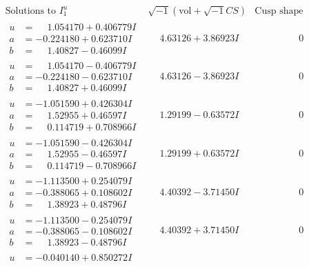 \documentclass[1p]{elsarticle_modified}
\theoremstyle{definition}
\newcommand{\I}{\sqrt{-1}}
\begin{document}
$$\begin{array}{c|c|c}
\text{Solutions to }I^u_{1}& \I (\text{vol} + \sqrt{-1}CS) & \text{Cusp shape}\\
 \hline 
\begin{aligned}
u &= \phantom{-}1.054170 + 0.406779 I \\
a &= -0.224180 + 0.623710 I \\
b &= \phantom{-}1.40827 - 0.46099 I\end{aligned}
 & \phantom{-}4.63126 + 3.86923 I & \phantom{-0.000000 } 0 \\ \hline\begin{aligned}
u &= \phantom{-}1.054170 - 0.406779 I \\
a &= -0.224180 - 0.623710 I \\
b &= \phantom{-}1.40827 + 0.46099 I\end{aligned}
 & \phantom{-}4.63126 - 3.86923 I & \phantom{-0.000000 } 0 \\ \hline\begin{aligned}
u &= -1.051590 + 0.426304 I \\
a &= \phantom{-}1.52955 + 0.46597 I \\
b &= \phantom{-}0.114719 + 0.708966 I\end{aligned}
 & \phantom{-}1.29199 - 0.63572 I & \phantom{-0.000000 } 0 \\ \hline\begin{aligned}
u &= -1.051590 - 0.426304 I \\
a &= \phantom{-}1.52955 - 0.46597 I \\
b &= \phantom{-}0.114719 - 0.708966 I\end{aligned}
 & \phantom{-}1.29199 + 0.63572 I & \phantom{-0.000000 } 0 \\ \hline\begin{aligned}
u &= -1.113500 + 0.254079 I \\
a &= -0.388065 + 0.108602 I \\
b &= \phantom{-}1.38923 + 0.48796 I\end{aligned}
 & \phantom{-}4.40392 - 3.71450 I & \phantom{-0.000000 } 0 \\ \hline\begin{aligned}
u &= -1.113500 - 0.254079 I \\
a &= -0.388065 - 0.108602 I \\
b &= \phantom{-}1.38923 - 0.48796 I\end{aligned}
 & \phantom{-}4.40392 + 3.71450 I & \phantom{-0.000000 } 0 \\ \hline\begin{aligned}
u &= -0.040140 + 0.850272 I \\

\end{aligned}
\end{array}$$
\end{document}
